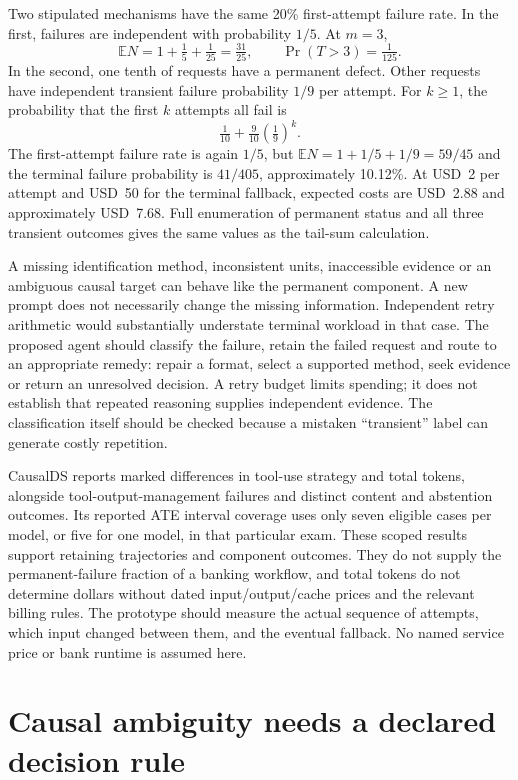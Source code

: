 Two stipulated mechanisms have the same 20\% first-attempt failure rate.
In the first, failures are independent with probability $1/5$. At $m=3$,
\[
 \mathbb E N=1+\tfrac15+\tfrac1{25}=\tfrac{31}{25},
 \qquad \Pr(T>3)=\tfrac1{125}.
\]
In the second, one tenth of requests have a permanent defect. Other requests
have independent transient failure probability $1/9$ per attempt. For $k\geq1$,
the probability that the first $k$ attempts all fail is
\[
 \tfrac1{10}+\tfrac9{10}\left(\tfrac19\right)^k.
\]
The first-attempt failure rate is again $1/5$, but
$\mathbb E N=1+1/5+1/9=59/45$ and the terminal failure probability is
$41/405$, approximately 10.12\%. At USD~2 per attempt and USD~50 for the
terminal fallback, expected costs are USD~2.88 and approximately USD~7.68.
Full enumeration of permanent status and all three transient outcomes gives
the same values as the tail-sum calculation. \citep{exec14_l8_economics}

A missing identification method, inconsistent units, inaccessible evidence or
an ambiguous causal target can behave like the permanent component. A new
prompt does not necessarily change the missing information. Independent
retry arithmetic would substantially understate terminal workload in that
case. The proposed agent should classify the failure, retain the failed
request and route to an appropriate remedy: repair a format, select a supported
method, seek evidence or return an unresolved decision. A retry budget limits
spending; it does not establish that repeated reasoning supplies independent
evidence. The classification itself should be checked because a mistaken
``transient'' label can generate costly repetition.

CausalDS reports marked differences in tool-use strategy and total tokens,
alongside tool-output-management failures and distinct content and abstention
outcomes. Its reported ATE interval coverage uses only seven eligible cases
per model, or five for one model, in that particular exam. These scoped results
support retaining trajectories and component outcomes. They do not supply the
permanent-failure fraction of a banking workflow, and total tokens do not
determine dollars without dated input/output/cache prices and the relevant
billing rules. The prototype should measure the actual sequence of attempts,
which input changed between them, and the eventual fallback. No named service
price or bank runtime is assumed here. \citep{v12_la_2607_08093}

\section{Causal ambiguity needs a declared decision rule}
\label{exec14:l8-ambiguity}

